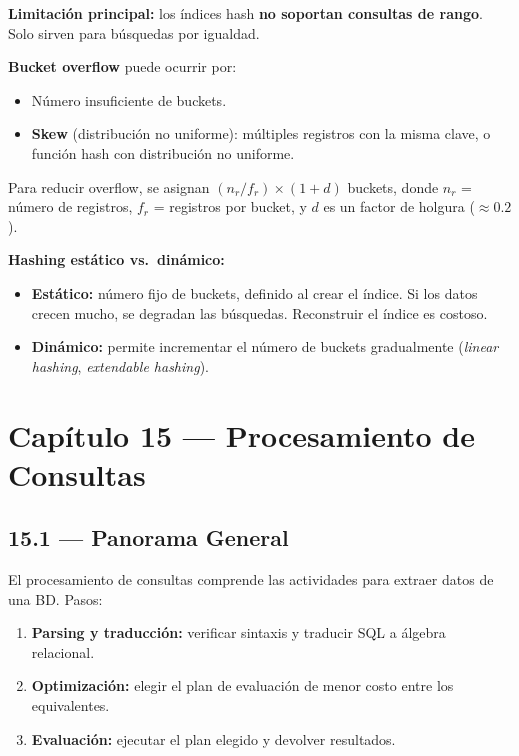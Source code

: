 \documentclass[11pt, a4paper]{article}
\begin{document}
\textbf{Limitación principal:} los índices hash \textbf{no soportan consultas de rango}. Solo sirven para búsquedas por igualdad.

\textbf{Bucket overflow} puede ocurrir por:
\begin{itemize}[nosep]
	\item Número insuficiente de buckets.
	\item \textbf{Skew} (distribución no uniforme): múltiples registros con la misma clave, o función hash con distribución no uniforme.
\end{itemize}

Para reducir overflow, se asignan $(n_r / f_r) \times (1 + d)$ buckets, donde $n_r$ = número de registros, $f_r$ = registros por bucket, y $d$ es un factor de holgura ($\approx 0.2$).

\textbf{Hashing estático vs.\ dinámico:}
\begin{itemize}[nosep]
	\item \textbf{Estático:} número fijo de buckets, definido al crear el índice. Si los datos crecen mucho, se degradan las búsquedas. Reconstruir el índice es costoso.
	\item \textbf{Dinámico:} permite incrementar el número de buckets gradualmente (\textit{linear hashing}, \textit{extendable hashing}).
\end{itemize}

\newpage
\section{Capítulo 15 --- Procesamiento de Consultas}

\subsection{15.1 --- Panorama General}

El procesamiento de consultas comprende las actividades para extraer datos de una BD. Pasos:
\begin{enumerate}[nosep]
	\item \textbf{Parsing y traducción:} verificar sintaxis y traducir SQL a álgebra relacional.
	\item \textbf{Optimización:} elegir el plan de evaluación de menor costo entre los equivalentes.
	\item \textbf{Evaluación:} ejecutar el plan elegido y devolver resultados.
\end{enumerate}
\end{document}
